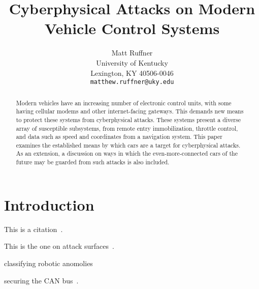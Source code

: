 \documentclass[10pt,twocolumn,letterpaper]{article}
\begin{document}
\title{ Cyberphysical Attacks on Modern Vehicle Control Systems}

\author{Matt Ruffner\\
University of Kentucky\\
Lexington, KY 40506-0046\\
{\tt\small matthew.ruffner@uky.edu}}


\maketitle

\begin{abstract}
  Modern vehicles have an increasing number of electronic control units, with some having cellular modems and other internet-facing gateways. This demands new means to protect these systems from cyberphysical attacks. These systems present a diverse array of susceptible subsystems, from remote entry immobilization, throttle control, and data such as speed and coordinates from a navigation system. This paper examines the established means by which cars are a target for cyberphysical attacks. As an extension, a discussion on ways in which the even-more-connected cars of the future may be guarded from such attacks is also included. 
\end{abstract}

\section{Introduction}

This is a citation~\cite{KoscherKarl2010ESAo}.

This is the one on attack surfaces~\cite{Checkoway:2011:CEA:2028067.2028073}.

classifying robotic anomolies~\cite{BezemskijAnatolij2016BADo}

securing the CAN bus~\cite{CabertoEddie2017AMoS}.


{\small


}
\end{document}
